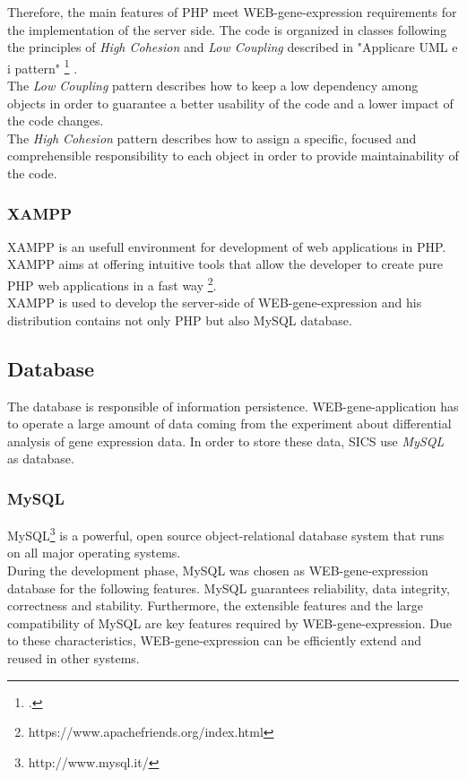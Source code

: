 \documentclass[a4paper]{report}
\begin{document}
Therefore, the main features of PHP meet WEB-gene-expression requirements for the implementation of the server side. The code is organized in classes following the principles of \emph{High Cohesion} and \emph{Low Coupling} described in "Applicare UML e i pattern" \footcite{Craig Larman, Luca Cabibbo} . \\
The \emph{Low Coupling} pattern describes how to keep a low dependency among objects in order to guarantee a better usability of the code and a lower impact of the code changes.\\
The \emph{High Cohesion} pattern describes how to assign a specific, focused and comprehensible responsibility to each object in order to provide maintainability of the code.\\

\subsubsection{XAMPP}

XAMPP is an usefull environment for development of web applications in PHP. XAMPP aims at offering intuitive tools that allow the developer to create pure PHP web applications in a fast way \footnote{https://www.apachefriends.org/index.html}.\\
XAMPP is used to develop the server-side of WEB-gene-expression and his distribution contains not only PHP but also MySQL database.

\subsection{Database}

The database is responsible of information persistence. WEB-gene-application has to operate a large amount of data coming from the experiment about differential analysis of gene expression data. In order to store these data, SICS use \emph{MySQL} as database.

\subsubsection{MySQL}

MySQL\footnote{http://www.mysql.it/} is a powerful, open source object-relational database system that runs on all major operating systems.
\\During the development phase, MySQL was chosen as WEB-gene-expression database for the following features. MySQL guarantees reliability, data integrity, correctness and stability. Furthermore, the extensible features and the large compatibility of MySQL are key features required by WEB-gene-expression. Due to these characteristics, WEB-gene-expression can be efficiently extend and reused in other systems.
\end{document}
